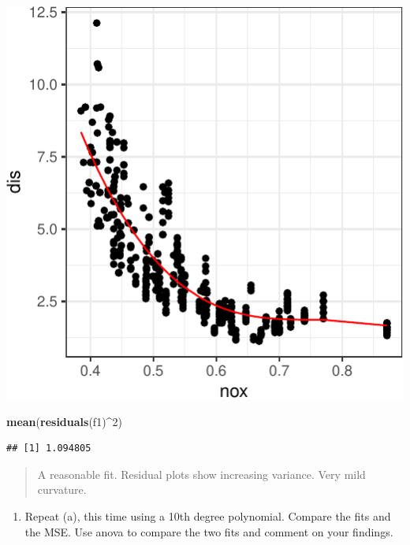 \documentclass[]{article}
\newenvironment{Shaded}{\begin{snugshade}}{\end{snugshade}}
\newcommand{\DecValTok}[1]{\textcolor[rgb]{0.00,0.00,0.81}{#1}}
\newcommand{\KeywordTok}[1]{\textcolor[rgb]{0.13,0.29,0.53}{\textbf{#1}}}
\newcommand{\NormalTok}[1]{#1}
\newcommand{\OperatorTok}[1]{\textcolor[rgb]{0.81,0.36,0.00}{\textbf{#1}}}
\providecommand{\tightlist}{%
  \setlength{\itemsep}{0pt}\setlength{\parskip}{0pt}}
\begin{document}
\begin{center}\includegraphics{sol_A4_files/figure-latex/unnamed-chunk-1-1} \end{center}

\begin{Shaded}
\begin{Highlighting}[]
\KeywordTok{mean}\NormalTok{(}\KeywordTok{residuals}\NormalTok{(f1)}\OperatorTok{^}\DecValTok{2}\NormalTok{)}
\end{Highlighting}
\end{Shaded}

\begin{verbatim}
## [1] 1.094805
\end{verbatim}

\begin{quote}
A reasonable fit. Residual plots show increasing variance. Very mild
curvature.
\end{quote}

\begin{enumerate}
\def\labelenumi{(\alph{enumi})}
\setcounter{enumi}{1}
\tightlist
\item
  Repeat (a), this time using a 10th degree polynomial. Compare the fits
  and the MSE. Use anova to compare the two fits and comment on your
  findings.
\end{enumerate}
\end{document}
